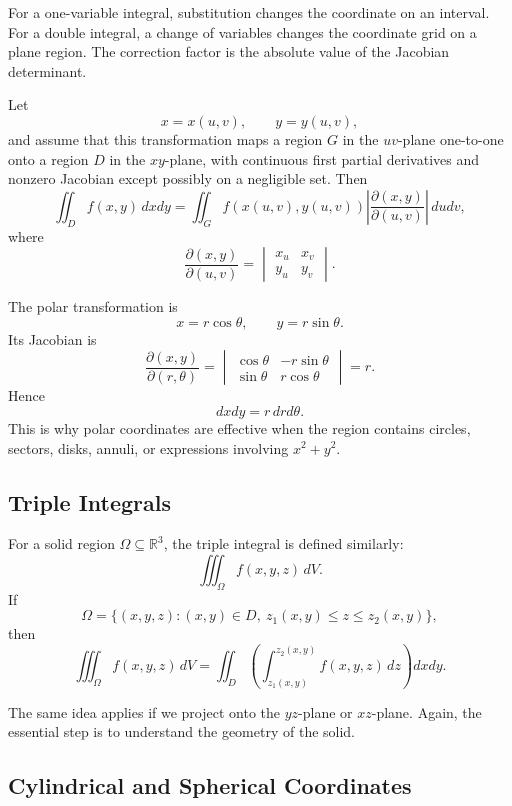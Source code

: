 For a one-variable integral, substitution changes the coordinate on an interval. For a double integral, a change of variables changes the coordinate grid on a plane region. The correction factor is the absolute value of the Jacobian determinant.

Let
\[
    x=x(u,v),\qquad y=y(u,v),
\]
and assume that this transformation maps a region $G$ in the $uv$-plane one-to-one onto a region $D$ in the $xy$-plane, with continuous first partial derivatives and nonzero Jacobian except possibly on a negligible set. Then
\[
    \iint_D f(x,y)\,dxdy
    =\iint_G f(x(u,v),y(u,v))
    \left|\frac{\partial(x,y)}{\partial(u,v)}\right|\,dudv,
\]
where
\[
    \frac{\partial(x,y)}{\partial(u,v)}
    =
    \begin{vmatrix}
        x_u & x_v\\
        y_u & y_v
    \end{vmatrix}.
\]

\begin{example}
The polar transformation is
\[
    x=r\cos\theta,
    \qquad
    y=r\sin\theta.
\]
Its Jacobian is
\[
    \frac{\partial(x,y)}{\partial(r,\theta)}
    =
    \begin{vmatrix}
        \cos\theta & -r\sin\theta\\
        \sin\theta & r\cos\theta
    \end{vmatrix}
    =r.
\]
Hence
\[
    dxdy=r\,drd\theta.
\]
This is why polar coordinates are effective when the region contains circles, sectors, disks, annuli, or expressions involving $x^2+y^2$.
\end{example}

\subsection{Triple Integrals}

For a solid region $\Omega\subseteq\mathbb{R}^3$, the triple integral is defined similarly:
\[
    \iiint_{\Omega} f(x,y,z)\,dV.
\]
If
\[
    \Omega=\{(x,y,z):(x,y)\in D,\ z_1(x,y)\le z\le z_2(x,y)\},
\]
then
\[
    \iiint_{\Omega} f(x,y,z)\,dV
    =\iint_D\left(\int_{z_1(x,y)}^{z_2(x,y)} f(x,y,z)\,dz\right)dxdy.
\]

The same idea applies if we project onto the $yz$-plane or $xz$-plane. Again, the essential step is to understand the geometry of the solid.

\subsection{Cylindrical and Spherical Coordinates}

